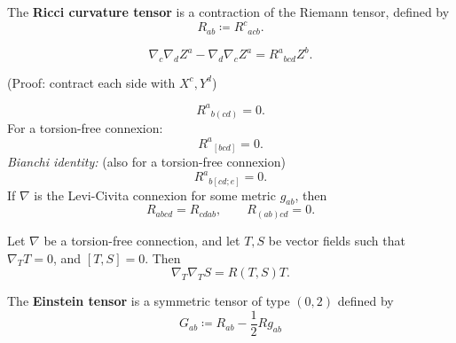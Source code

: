 \documentclass[12pt]{article}
\begin{document}
\begin{definition}
	The \textbf{Ricci curvature tensor} is a contraction of the Riemann tensor, defined by
		\begin{equation}
			R_{ab} \coloneqq {R^c}_{acb}.
		\end{equation}
\end{definition}

\begin{noteEquation}
	\begin{equation}
		\nabla_c \nabla_d Z^a - \nabla_d \nabla_c Z^a = {R^a}_{bcd} Z^b.
	\end{equation}
\end{noteEquation}
(Proof: contract each side with $X^c, Y^d$)

\begin{noteEquation}
		\begin{equation}
			{R^a}_{b(cd)} = 0.
		\end{equation}
	For a torsion-free connexion:
		\begin{equation}
			{R^a}_{[bcd]} = 0.
		\end{equation}
	\textit{Bianchi identity:} (also for a torsion-free connexion)
		\begin{equation}
			{R^a}_{b[cd;e]} = 0.
		\end{equation}
	If $\nabla$ is the Levi-Civita connexion for some metric $g_{ab}$, then
		\begin{equation}
			R_{abcd} = R_{cdab}, \qquad R_{(ab)cd} = 0.
		\end{equation}
\end{noteEquation}

\begin{noteEquation}
	Let $\nabla$ be a torsion-free connection, and let $T,S$ be vector fields such that $\nabla_T T = 0$, and $[T,S] = 0$. Then
		\begin{equation}
			\nabla_T \nabla_T S = R(T,S) T.
		\end{equation}
\end{noteEquation}

\begin{definition}
	The \textbf{Einstein tensor} is a symmetric tensor of type $(0,2)$ defined by
		\begin{equation}
			G_{ab} \coloneqq R_{ab} - \frac{1}{2}Rg_{ab}
		\end{equation}
\end{definition}
\end{document}
